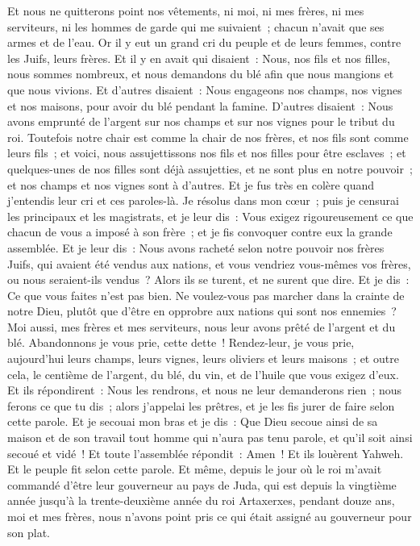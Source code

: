 \begin{multicols}{2}
Et nous ne quitterons point nos vêtements, ni moi, ni mes frères, ni mes serviteurs, ni les hommes de garde qui me suivaient~; chacun n'avait que ses armes et de l'eau.
\VerseOne{}Or il y eut un grand cri du peuple et de leurs femmes, contre les Juifs, leurs frères.
Et il y en avait qui disaient~: Nous, nos fils et nos filles, nous sommes nombreux, et nous demandons du blé afin que nous mangions et que nous vivions.
Et d'autres disaient~: Nous engageons nos champs, nos vignes et nos maisons, pour avoir du blé pendant la famine.
D'autres disaient~: Nous avons emprunté de l'argent sur nos champs et sur nos vignes pour le tribut du roi.
Toutefois notre chair est comme la chair de nos frères, et nos fils sont comme leurs fils~; et voici, nous assujettissons nos fils et nos filles pour être esclaves~; et quelques-unes de nos filles sont déjà assujetties, et ne sont plus en notre pouvoir~; et nos champs et nos vignes sont à d'autres.
Et je fus très en colère quand j'entendis leur cri et ces paroles-là.
Je résolus dans mon cœur~; puis je censurai les principaux et les magistrats, et je leur dis~: Vous exigez rigoureusement ce que chacun de vous a imposé à son frère~; et je fis convoquer contre eux la grande assemblée. 
Et je leur dis~: Nous avons racheté selon notre pouvoir nos frères Juifs, qui avaient été vendus aux nations, et vous vendriez vous-mêmes vos frères, ou nous seraient-ils vendus~? Alors ils se turent, et ne surent que dire. 
Et je dis~: Ce que vous faites n'est pas bien. Ne voulez-vous pas marcher dans la crainte de notre Dieu, plutôt que d'être en opprobre aux nations qui sont nos ennemies~?
Moi aussi, mes frères et mes serviteurs, nous leur avons prêté de l'argent et du blé. Abandonnons je vous prie, cette dette~!
Rendez-leur, je vous prie, aujourd'hui leurs champs, leurs vignes, leurs oliviers et leurs maisons~; et outre cela, le centième de l'argent, du blé, du vin, et de l'huile que vous exigez d'eux.
Et ils répondirent~: Nous les rendrons, et nous ne leur demanderons rien~; nous ferons ce que tu dis~; alors j'appelai les prêtres, et je les fis jurer de faire selon cette parole.
Et je secouai mon bras et je dis~: Que Dieu secoue ainsi de sa maison et de son travail tout homme qui n'aura pas tenu parole, et qu'il soit ainsi secoué et vidé~! Et toute l'assemblée répondit~: Amen~! Et ils louèrent Yahweh. Et le peuple fit selon cette parole.
Et même, depuis le jour où le roi m'avait commandé d'être leur gouverneur au pays de Juda, qui est depuis la vingtième année jusqu'à la trente-deuxième année du roi Artaxerxes, pendant douze ans, moi et mes frères, nous n'avons point pris ce qui était assigné au gouverneur pour son plat.

\end{multicols}

